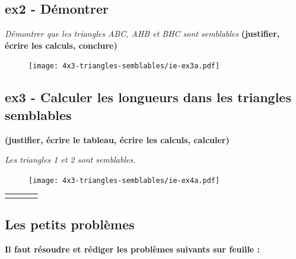 \begin{minipage}[t]{0.55\textwidth}
  \subsection*{ex2 - Démontrer}
  \textit{Démontrer que les triangles ABC, AHB et BHC sont semblables}
  \textbf{(justifier, écrire les calculs, conclure)}
  \begin{figure}[H]
    \centering
    \texttt{[image: 4x3-triangles-semblables/ie-ex3a.pdf]}
  \end{figure}
\end{minipage}
\begin{minipage}[t]{0.4\textwidth}
  \Pointilles[14]
\end{minipage}

\newpage

\subsection*{ex3 - Calculer les longueurs dans les triangles semblables}
\textbf{(justifier, écrire le tableau, écrire les calculs, calculer)} \newline
\begin{minipage}[t]{0.45\textwidth}
  \textit{Les triangles 1 et 2 sont semblables.} 
  \begin{figure}[H]
    \centering
    \texttt{[image: 4x3-triangles-semblables/ie-ex4a.pdf]}
  \end{figure}
\end{minipage}
\begin{minipage}[t]{0.55\textwidth}
  \begin{tabular}{|c|c|c|c|}
    \hline
    \phantom{$\dfrac{azerty}{1}$} & \phantom{azerty}  & \phantom{azerty} & \phantom{azerty} \\ \hline
    \phantom{$\dfrac{azerty}{1}$} & \phantom{azerty}  & \phantom{azerty} & \phantom{azerty} \\   \hline
  \end{tabular}

  \Pointilles[6]
\end{minipage}


\subsection*{Les petits problèmes}
\textbf{Il faut résoudre et rédiger les problèmes suivants sur feuille :} 

